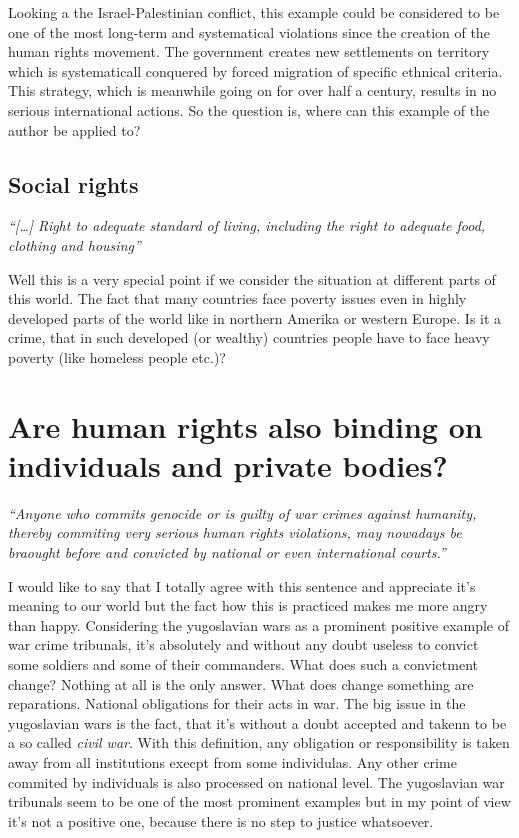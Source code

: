 Looking a the Israel-Palestinian conflict, this example could be
considered to be one of the most long-term and systematical violations
since the creation of the human rights movement. The government
creates new settlements on territory which is systematicall conquered
by forced migration of specific ethnical criteria. This strategy, which
is meanwhile going on for over half a century, results in no serious
international actions. So the question is, where can this example of
the author be applied to?

\subsection{Social rights}
\emph{``[\dots] Right to adequate standard of living, including the right
to adequate food, clothing and housing''}
\cite[p. 22]{tfohr}

Well this is a very special point if we consider the situation at
different parts of this world. The fact that many countries face
poverty issues even in highly developed parts of the world like in
northern Amerika or western Europe. Is it a crime, that in such
developed (or wealthy) countries people have to face heavy poverty
(like homeless people etc.)?

\section{Are human rights also binding on individuals and private bodies?}
\emph{``Anyone who commits genocide or is guilty of war crimes against
humanity, thereby commiting very serious human rights violations, may
nowadays be braought before and convicted by national or even
international courts.''}
\cite[p. 27]{tfohr}

I would like to say that I totally agree with this sentence and
appreciate it's meaning to our world but the fact how this is practiced
makes me more angry than happy. Considering the yugoslavian wars as a
prominent positive example of war crime tribunals, it's absolutely and
without any doubt useless to convict some soldiers and some of their
commanders. What does such a convictment change? Nothing at all is the only
answer. What does change something are reparations. National obligations
for their acts in war. The big issue in the yugoslavian wars is the fact,
that it's without a doubt accepted and takenn to be a so called
\emph{civil war}. With this definition, any obligation or responsibility
is taken away from all institutions execpt from some individulas. Any
other crime commited by individuals is also processed on national level.
The yugoslavian war tribunals seem to be one of the most prominent examples
but in my point of view it's not a positive one, because there is no step
to justice whatsoever.

